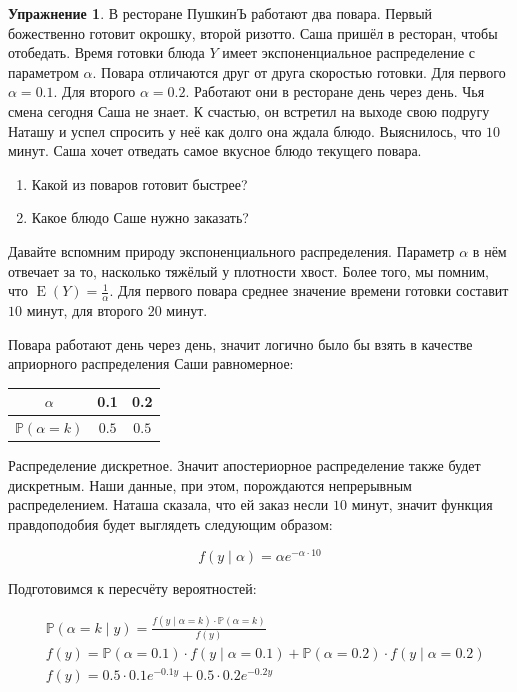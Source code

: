 \documentclass[12pt, a4paper, oneside]{extreport}
\DeclareMathOperator{\E}{\mathop{E}}
\def \mbb{\mathbb}
\def \PP{\mbb{P}}
\theoremstyle{plain}              %
\theoremstyle{definition}         %
\newtheorem{problem}{\color{myblue} Упражнение}
\begin{document}
\begin{problem}
	
В ресторане ПушкинЪ работают два повара. Первый божественно готовит окрошку, второй ризотто.  Саша пришёл в ресторан, чтобы отобедать. Время готовки блюда $Y$ имеет экспоненциальное распределение с параметром $\alpha$.  Повара отличаются друг от друга скоростью готовки.  Для первого $\alpha = 0.1$. Для второго $\alpha = 0.2$. Работают они в ресторане день через день. Чья смена сегодня Саша не знает.  К счастью, он встретил на выходе свою подругу Наташу и успел спросить у неё как долго она ждала блюдо. Выяснилось, что $10$ минут.  Саша хочет отведать самое вкусное блюдо текущего повара. 

\begin{enumerate}
	\item  Какой из поваров готовит быстрее? 
	\item  Какое блюдо Саше нужно заказать? 
\end{enumerate}

	\begin{sol}
		Давайте вспомним природу экспоненциального распределения. Параметр $\alpha$ в нём отвечает за то, насколько тяжёлый у плотности хвост.  Более того, мы помним, что $\E(Y) = \frac{1}{\alpha}$. Для первого повара среднее значение времени готовки составит $10$ минут, для второго $20$ минут. 
		
		Повара работают день через день, значит логично было бы взять в качестве априорного распределения Саши равномерное: 
		
		\begin{center}
			\begin{tabular}{c|c|c}
				$\alpha$ & 0.1 & 0.2 \\ \hline
				$\PP(\alpha= k)$ & $0.5$ & $0.5$ \\ 
			\end{tabular}
		\end{center}
		
		Распределение дискретное. Значит апостериорное распределение также будет дискретным. Наши данные, при этом, порождаются непрерывным распределением. Наташа сказала, что ей заказ несли $10$ минут, значит функция правдоподобия будет выглядеть следующим образом: 
		
		\[ f(y \mid \alpha) = \alpha e^{-\alpha \cdot 10} \]
		
		Подготовимся к пересчёту вероятностей: 
		
		\begin{equation*}
		\begin{aligned}
		&\PP(\alpha = k \mid y) = \frac{f(y \mid \alpha = k) \cdot \PP(\alpha =k)}{f(y)} \\
		&f(y) = \PP(\alpha = 0.1) \cdot f(y \mid \alpha = 0.1) + \PP(\alpha = 0.2) \cdot f(y \mid \alpha = 0.2) \\
		&f(y) = 0.5 \cdot 0.1 e^{-0.1 y}  +  0.5 \cdot 0.2 e^{-0.2 y} \\
		\end{aligned}
		\end{equation*}
		

\end{sol}
\end{problem}
\end{document}
